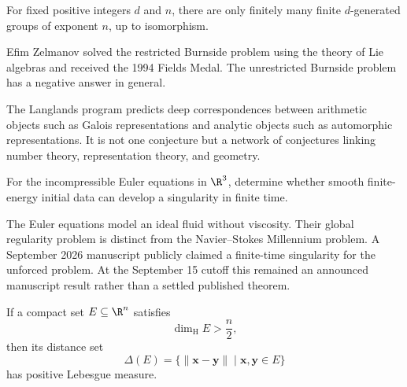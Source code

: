     \begin{theorem}
        For fixed positive integers $d$ and $n$, there are only finitely many
        finite $d$-generated groups of exponent $n$, up to isomorphism.
    \end{theorem}

    \begin{remark}
        Efim Zelmanov solved the restricted Burnside problem using the theory of
        Lie algebras and received the 1994 Fields Medal. The unrestricted
        Burnside problem has a negative answer in general.
    \end{remark}

    \begin{fact}
        The Langlands program predicts deep correspondences between arithmetic
        objects such as Galois representations and analytic objects such as
        automorphic representations. It is not one conjecture but a network of
        conjectures linking number theory, representation theory, and geometry.
    \end{fact}

    \begin{openproblem}
        For the incompressible Euler equations in $\R^3$, determine whether
        smooth finite-energy initial data can develop a singularity in finite
        time.
    \end{openproblem}

    \begin{remark}
        The Euler equations model an ideal fluid without viscosity. Their global
        regularity problem is distinct from the Navier--Stokes Millennium
        problem. A September 2026 manuscript publicly claimed a finite-time
        singularity for the unforced problem. At the September 15 cutoff this
        remained an announced manuscript result rather than a settled published
        theorem.
    \end{remark}

    \begin{conjecture}
        If a compact set $E\subseteq\R^n$ satisfies
        \[
            \dim_{\mathrm{H}}E>\frac{n}{2},
        \]
        then its distance set
        \[
            \Delta(E)
            =
            \{\|\mathbf{x}-\mathbf{y}\|\mid\mathbf{x},\mathbf{y}\in E\}
        \]
        has positive Lebesgue measure.
    \end{conjecture}

